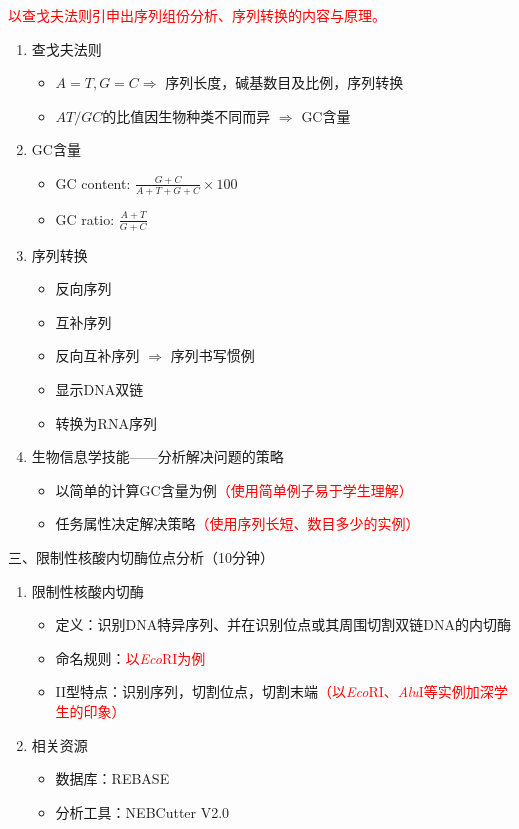 \documentclass{TIJMUjiaoanLL}
\begin{document}
\textcolor{red}{以查戈夫法则引申出序列组份分析、序列转换的内容与原理。}
\begin{enumerate}
	\item 查戈夫法则
		\begin{itemize}
			\item $A=T, G=C \Rightarrow$ 序列长度，碱基数目及比例，序列转换
			\item $AT/GC$的比值因生物种类不同而异 $\Rightarrow$ GC含量
		\end{itemize}
	\item GC含量
		\begin{itemize}
			\item GC content: $\frac{G+C}{A+T+G+C} \times 100$
			\item GC ratio: $\frac{A+T}{G+C}$
		\end{itemize}
	\item 序列转换
		\begin{itemize}
			\item 反向序列
			\item 互补序列
			\item 反向互补序列 $\Rightarrow$ 序列书写惯例
			\item 显示DNA双链
			\item 转换为RNA序列
		\end{itemize}
	\item 生物信息学技能——分析解决问题的策略
		\begin{itemize}
			\item 以简单的计算GC含量为例\textcolor{red}{（使用简单例子易于学生理解）}
			\item 任务属性决定解决策略\textcolor{red}{（使用序列长短、数目多少的实例）}
		\end{itemize}
\end{enumerate}

\noindent
三、限制性核酸内切酶位点分析（10分钟）
\begin{enumerate}
	\item 限制性核酸内切酶
		\begin{itemize}
			\item 定义：识别DNA特异序列、并在识别位点或其周围切割双链DNA的内切酶
			\item 命名规则：\textcolor{red}{以\textit{Eco}RI为例}
			\item II型特点：识别序列，切割位点，切割末端\textcolor{red}{（以\textit{Eco}RI、\textit{Alu}I等实例加深学生的印象）}
		\end{itemize}
	\item 相关资源
		\begin{itemize}
			\item 数据库：REBASE
			\item 分析工具：NEBCutter V2.0
		\end{itemize}
\end{enumerate}
\end{document}
